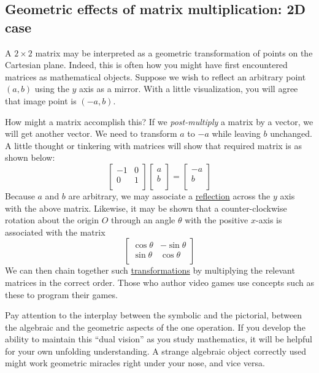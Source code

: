 \documentclass[
  a4paper,
]{article}
\begin{document}
\hypertarget{geometric-effects-of-matrix-multiplication-2d-case}{%
\subsection{Geometric effects of matrix multiplication: 2D
case}\label{geometric-effects-of-matrix-multiplication-2d-case}}

A \(2\times 2\) matrix may be interpreted as a geometric transformation
of points on the Cartesian plane. Indeed, this is often how you might
have first encountered matrices as mathematical objects. Suppose we wish
to reflect an arbitrary point \((a, b)\) using the \(y\) axis as a
mirror. With a little visualization, you will agree that image point is
\((-a, b)\).

How might a matrix accomplish this? If we \emph{post-multiply} a matrix
by a vector, we will get another vector. We need to transform \(a\) to
\(-a\) while leaving \(b\) unchanged. A little thought or tinkering with
matrices will show that required matrix is as shown below: \[
\begin{bmatrix}
-1 & 0\\
0 & 1\\
\end{bmatrix}
\begin{bmatrix}
a\\b\\
\end{bmatrix}
= %
\begin{bmatrix}
-a\\b\\
\end{bmatrix}
\] Because \(a\) and \(b\) are arbitrary, we may associate a
\href{http://planetmath.org/encyclopedia/DerivationOf2DReflectionMatrix.html}{reflection}
across the \(y\) axis with the above matrix. Likewise, it may be shown
that a counter-clockwise rotation about the origin \(O\) through an
angle \(\theta\) with the positive \(x\)-axis is associated with the
matrix \[
\begin{bmatrix}
\cos\theta & -\sin\theta\\
\sin\theta & \cos\theta\\
\end{bmatrix}
\] We can then chain together such
\href{http://en.wikipedia.org/wiki/Transformation_matrix}{transformations}
by multiplying the relevant matrices in the correct order. Those who
author video games use concepts such as these to program their games.

Pay attention to the interplay between the symbolic and the pictorial,
between the algebraic and the geometric aspects of the one operation. If
you develop the ability to maintain this ``dual vision'' as you study
mathematics, it will be helpful for your own unfolding understanding. A
strange algebraic object correctly used might work geometric miracles
right under your nose, and vice versa.
\end{document}
